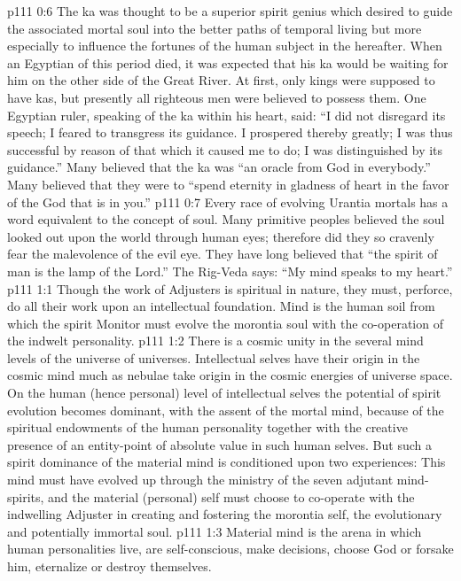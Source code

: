 \vs p111 0:6 The ka was thought to be a superior spirit genius which desired to guide the associated mortal soul into the better paths of temporal living but more especially to influence the fortunes of the human subject in the hereafter. When an Egyptian of this period died, it was expected that his ka would be waiting for him on the other side of the Great River. At first, only kings were supposed to have kas, but presently all righteous men were believed to possess them. One Egyptian ruler, speaking of the ka within his heart, said: “I did not disregard its speech; I feared to transgress its guidance. I prospered thereby greatly; I was thus successful by reason of that which it caused me to do; I was distinguished by its guidance.” Many believed that the ka was “an oracle from God in everybody.” Many believed that they were to “spend eternity in gladness of heart in the favor of the God that is in you.”
\vs p111 0:7 Every race of evolving Urantia mortals has a word equivalent to the concept of soul. Many primitive peoples believed the soul looked out upon the world through human eyes; therefore did they so cravenly fear the malevolence of the evil eye. They have long believed that “the spirit of man is the lamp of the Lord.” The Rig\hyp{}Veda says: “My mind speaks to my heart.”
\vs p111 1:1 Though the work of Adjusters is spiritual in nature, they must, perforce, do all their work upon an intellectual foundation. Mind is the human soil from which the spirit Monitor must evolve the morontia soul with the co\hyp{}operation of the indwelt personality.
\vs p111 1:2 There is a cosmic unity in the several mind levels of the universe of universes. Intellectual selves have their origin in the cosmic mind much as nebulae take origin in the cosmic energies of universe space. On the human (hence personal) level of intellectual selves the potential of spirit evolution becomes dominant, with the assent of the mortal mind, because of the spiritual endowments of the human personality together with the creative presence of an entity\hyp{}point of absolute value in such human selves. But such a spirit dominance of the material mind is conditioned upon two experiences: This mind must have evolved up through the ministry of the seven adjutant mind\hyp{}spirits, and the material (personal) self must choose to co\hyp{}operate with the indwelling Adjuster in creating and fostering the morontia self, the evolutionary and potentially immortal soul.
\pc \vs p111 1:3 Material mind is the arena in which human personalities live, are self\hyp{}conscious, make decisions, choose God or forsake him, eternalize or destroy themselves.
